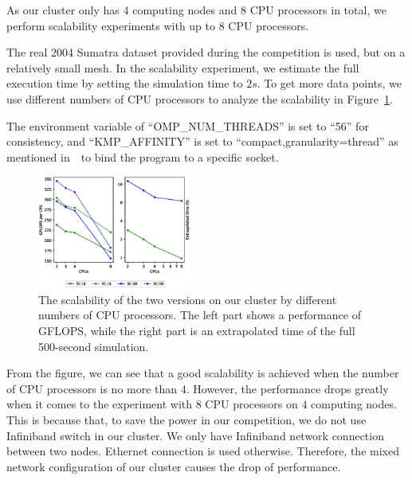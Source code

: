 \documentclass[5p,times]{sig-alternate-05-2015}
\begin{document}
As our cluster only has 4 computing nodes and 8 CPU processors in total, we perform scalability experiments with up to 8 CPU processors.


The real 2004 Sumatra dataset provided during the competition is used, but on a relatively small mesh. In the scalability experiment, we estimate the full execution time by setting the simulation time to $2s$. To get more data points, we use different numbers of CPU processors to analyze the scalability in Figure~\ref{fig:sca}.


The environment variable of ``OMP\_NUM\_THREADS'' is set to ``56'' for consistency, and ``KMP\_AFFINITY'' is set to ``compact,granularity=thread'' as mentioned in~\OriginalPaper\ to bind the program to a specific socket.

\begin{figure}[!ht]
	\centering
	\includegraphics[width=0.45\textwidth]{scale.eps}
	\caption{The scalability of the two versions on our cluster by different numbers of CPU processors. The left part shows a performance of GFLOPS, while the right part is an extrapolated time of the full 500-second simulation.}
	\label{fig:sca}
\end{figure}

From the figure, we can see that a good scalability is achieved when the number of CPU processors is no more than 4. However, the performance drops greatly when it comes to the experiment with $8$ CPU processors on $4$ computing nodes. This is because that, to save the power in our competition, we do not use Infiniband switch in our cluster. We only have Infiniband network connection between two nodes. Ethernet connection is used otherwise. Therefore, the mixed network configuration of our cluster causes the drop of performance. 

\end{document}
